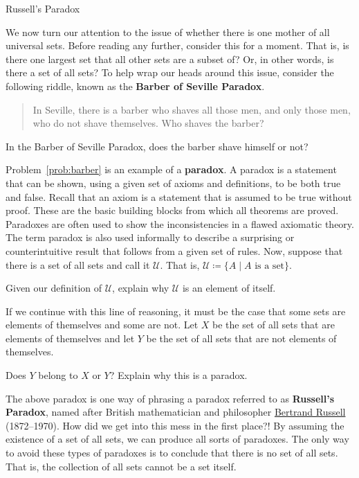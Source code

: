 \begin{section}{Russell's Paradox}\label{sec:RussellsParadox}

We now turn our attention to the issue of whether there is one mother of all universal sets.  Before reading any further, consider this for a moment.  That is, is there one largest set that all other sets are a subset of?  Or, in other words, is there a set of all sets?  To help wrap our heads around this issue, consider the following riddle, known as the \textbf{Barber of Seville Paradox}.

\begin{quote}
In Seville, there is a barber who shaves all those men, and only those men, who do not shave themselves.  Who shaves the barber?
\end{quote}

\begin{problem}\label{prob:barber}
In the Barber of Seville Paradox, does the barber shave himself or not?
\end{problem}

Problem~\ref{prob:barber} is an example of a \textbf{paradox}. A paradox is a statement that can be shown, using a given set of axioms and definitions, to be both true and false. Recall that an axiom is a statement that is assumed to be true without proof. These are the basic building blocks from which all theorems are proved. Paradoxes are often used to show the inconsistencies in a flawed axiomatic theory.  The term paradox is also used informally to describe a surprising or counterintuitive result that follows from a given set of rules.  Now, suppose that there is a set of all sets and call it $\mathcal{U}$.  That is, $\mathcal{U}\coloneqq \{A\mid A\mbox{ is a set}\}$.

\begin{problem}
Given our definition of $\mathcal{U}$, explain why $\mathcal{U}$ is an element of itself.
\end{problem}

If we continue with this line of reasoning, it must be the case that some sets are elements of themselves and some are not.  Let $X$ be the set of all sets that are elements of themselves and let $Y$ be the set of all sets that are not elements of themselves.

\begin{problem}\label{prob:russell}
Does $Y$ belong to $X$ or $Y$?  Explain why this is a paradox.
\end{problem}

The above paradox is one way of phrasing a paradox referred to as \textbf{Russell's Paradox}, named after British mathematician and philosopher \href{https://en.wikipedia.org/wiki/Bertrand_Russell}{Bertrand Russell} (1872--1970).  How did we get into this mess in the first place?!  By assuming the existence of a set of all sets, we can produce all sorts of paradoxes.  The only way to avoid these types of paradoxes is to conclude that there is no set of all sets.  That is, the collection of all sets cannot be a set itself.


\end{section}
